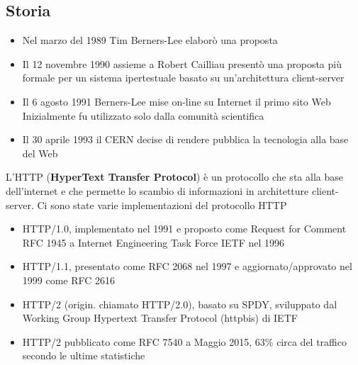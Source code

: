 \documentclass{article}
\begin{document}
\subsection{Storia}
\begin{itemize}
    \item Nel marzo del 1989 Tim Berners-Lee
    elaborò una proposta
    \item Il 12 novembre 1990 assieme a Robert
    Cailliau presentò una proposta più
    formale per un sistema ipertestuale
    basato su un'architettura client-server
    \item Il 6 agosto 1991 Berners-Lee mise
    on-line su Internet il primo sito Web
    Inizialmente fu utilizzato solo dalla
    comunità scientifica
    \item Il 30 aprile 1993 il CERN decise di
    rendere pubblica la tecnologia alla
    base del Web
\end{itemize}
L'HTTP (\textbf{HyperText Transfer Protocol}) è un protocollo che sta alla base dell'internet e che permette lo scambio di informazioni in architetture client-server. Ci sono state varie implementazioni del protocollo HTTP
\begin{itemize}
    \item HTTP/1.0, implementato nel 1991 e
    proposto come Request for Comment
    RFC 1945 a Internet Engineering Task
    Force IETF nel 1996
    \item HTTP/1.1, presentato come RFC
    2068 nel 1997 e aggiornato/approvato
    nel 1999 come RFC 2616
    \item HTTP/2 (origin. chiamato HTTP/2.0),
    basato su SPDY, sviluppato dal Working
    Group Hypertext Transfer Protocol
    (httpbis) di IETF
    \item HTTP/2 pubblicato come RFC 7540 a Maggio 2015, 63\% circa del traffico secondo le ultime statistiche
\end{itemize}
\end{document}

